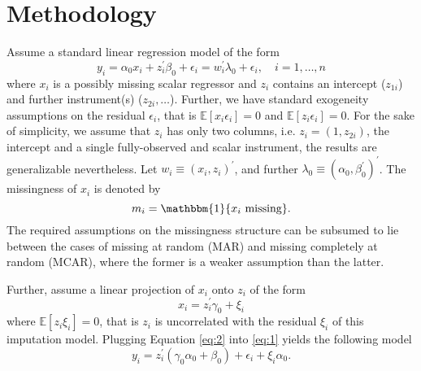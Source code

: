 \section{Methodology}
Assume a standard linear regression model of the form
\begin{equation}\label{eq:1}
    y_i = \alpha_0 x_i + z_i^{\prime} \beta_0 + \epsilon_i = w_i^{\prime} \lambda_0 + \epsilon_i, \quad i= 1,\ldots,n
\end{equation}
where $x_i$ is a possibly missing scalar regressor and $z_i$ contains an intercept ($z_{1i}$) and further instrument(s) ($z_{2i}, \ldots$).
Further, we have standard exogeneity assumptions on the residual $\epsilon_i$, that is $\mathbb{E}[x_i \epsilon_i] = 0$ and $\mathbb{E}[z_i \epsilon_i] = 0$.
For the sake of simplicity, we assume that $z_i$ has only two columns, i.e. $z_i = (1, z_{2i})$, the intercept and a single fully-observed and scalar instrument, the results are generalizable nevertheless.
Let $w_i \equiv (x_i, z_i)^{\prime}$, and further $\lambda_0 \equiv (\alpha_0, \beta_0^{\prime})^{\prime}$.
The missingness of $x_i$ is denoted by $$m_i = \mathbbm{1}\{x_i \text{ missing}\}.$$
The required assumptions on the missingness structure can be subsumed to lie between the cases of missing at random (MAR) and missing completely at random (MCAR), where the former is a weaker assumption than the latter.

Further, assume a linear projection of $x_i$ onto $z_i$ of the form
\begin{equation}\label{eq:2}
    x_i = z_i^{\prime} \gamma_0 + \xi_i
\end{equation}
where $\mathbb{E}[z_i \xi_i] = 0$, that is $z_i$ is uncorrelated with the residual $\xi_i$ of this imputation model.
Plugging Equation \eqref{eq:2} into \eqref{eq:1} yields the following model
\begin{equation}\label{eq:3}
    y_i = z_i^{\prime} (\gamma_0 \alpha_0 + \beta_0) + \epsilon_i + \xi_i \alpha_0 .
\end{equation}

